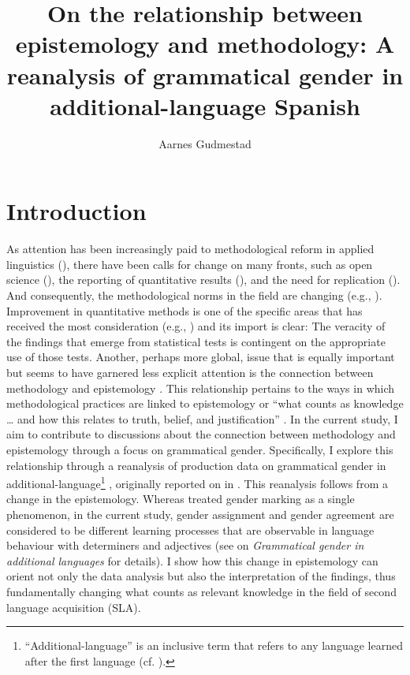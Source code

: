 \documentclass[output=paper,colorlinks,citecolor=brown,modfonts,nonflat]{../langscibook}
\author{Aarnes Gudmestad\affiliation{Virginia Polytechnic Institute and State University}\orcid{}}
\title{On the relationship between epistemology and methodology: \newlineCover A reanalysis of grammatical gender in additional-language Spanish}
\begin{document}
\maketitle

\section{Introduction}\label{sec:gudmestad:1}

As attention has been increasingly paid to methodological reform in applied linguistics (\citealt{Byrnes2013,PhakitiEtAl2018}), there have been calls for change on many fronts, such as open science (\citealt{MarsdenPlonsky2018}), the reporting of quantitative results (\citealt{Larsen-HallPlonsky2015}), and the need for replication (\citealt{PorteMcManus2018}). And consequently, the methodological norms in the field are changing (e.g., \citealt{MarsdenEtAl2018Reports}). Improvement in quantitative methods is one of the specific areas that has received the most consideration (e.g., \citealt{Plonsky2015}) and its import is clear: The veracity of the findings that emerge from statistical tests is contingent on the appropriate use of those tests. Another, perhaps more global, issue that is equally important but seems to have garnered less explicit attention is the connection between methodology and epistemology \citep{Ortega2005}. This relationship pertains to the ways in which methodological practices are linked to epistemology or “what counts as knowledge … and how this relates to truth, belief, and justification” \citep[40]{Young2018}. In the current study, I aim to contribute to discussions about the connection between methodology and epistemology through a focus on grammatical gender. Specifically, I explore this relationship through a reanalysis of production data on grammatical gender in additional-language\footnote{{``Additional-language'' is an inclusive term that refers to any language learned after the first language (cf. \citealt{TheDouglasFirGroup2016}).}} , originally reported on in \citet{GudmestadEtAl2019}. This reanalysis follows from a change in the epistemology. Whereas \citeauthor{GudmestadEtAl2019} treated gender marking as a single phenomenon, in the current study, gender assignment and gender agreement are considered to be different learning processes that are observable in language behaviour with determiners and adjectives (see  on \textit{Grammatical gender in additional languages} for details). I show how this change in epistemology can orient not only the data analysis but also the interpretation of the findings, thus fundamentally changing what counts as relevant knowledge in the field of second language acquisition (SLA).
\end{document}
